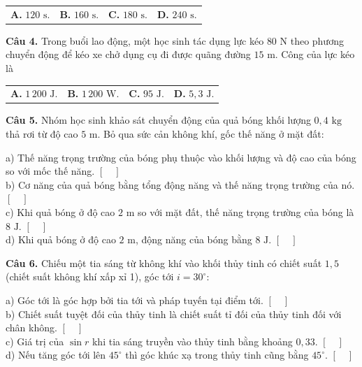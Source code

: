 \documentclass{article}
\begin{document}
\begin{tabularx}{\linewidth}{@{}X X X X@{}}
\textbf{A.} $120\text{ s}$. & \textbf{B.} $160\text{ s}$. & \textbf{C.} $180\text{ s}$. & \textbf{D.} $240\text{ s}$.
\end{tabularx}

\vspace*{\fill}

\textbf{Câu 4.} Trong buổi lao động, một học sinh tác dụng lực kéo $80\text{ N}$ theo phương chuyển động để kéo xe chở dụng cụ đi được quãng đường $15\text{ m}$. Công của lực kéo là
\vspace{6pt}

\begin{tabularx}{\linewidth}{@{}X X X X@{}}
\textbf{A.} $1\,200\text{ J}$. & \textbf{B.} $1\,200\text{ W}$. & \textbf{C.} $95\text{ J}$. & \textbf{D.} $5,3\text{ J}$.
\end{tabularx}
\vspace*{\fill}
\newpage

\fontsize{24}{32}\selectfont
\textbf{Câu 5.} Nhóm học sinh khảo sát chuyển động của quả bóng khối lượng $0,4\text{ kg}$ thả rơi từ độ cao $5\text{ m}$. Bỏ qua sức cản không khí, gốc thế năng ở mặt đất:
\vspace{12pt}

a) Thế năng trọng trường của bóng phụ thuộc vào khối lượng và độ cao của bóng so với mốc thế năng. \hfill $[\quad]$\\[10pt]
b) Cơ năng của quả bóng bằng tổng động năng và thế năng trọng trường của nó. \hfill $[\quad]$\\[10pt]
c) Khi quả bóng ở độ cao $2\text{ m}$ so với mặt đất, thế năng trọng trường của bóng là $8\text{ J}$. \hfill $[\quad]$\\[10pt]
d) Khi quả bóng ở độ cao $2\text{ m}$, động năng của bóng bằng $8\text{ J}$. \hfill $[\quad]$
\vspace*{\fill}
\newpage

\fontsize{24}{32}\selectfont
\textbf{Câu 6.} Chiếu một tia sáng từ không khí vào khối thủy tinh có chiết suất $1,5$ (chiết suất không khí xấp xỉ 1), góc tới $i = 30^\circ$:
\vspace{12pt}

a) Góc tới là góc hợp bởi tia tới và pháp tuyến tại điểm tới. \hfill $[\quad]$\\[10pt]
b) Chiết suất tuyệt đối của thủy tinh là chiết suất tỉ đối của thủy tinh đối với chân không. \hfill $[\quad]$\\[10pt]
c) Giá trị của $\sin r$ khi tia sáng truyền vào thủy tinh bằng khoảng $0,33$. \hfill $[\quad]$\\[10pt]
d) Nếu tăng góc tới lên $45^\circ$ thì góc khúc xạ trong thủy tinh cũng bằng $45^\circ$. \hfill $[\quad]$
\vspace*{\fill}
\newpage
\end{document}
